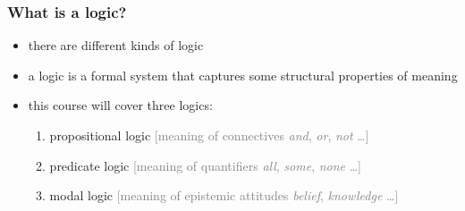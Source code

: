\documentclass[fleqn,10pt,serif,xcolor=svgnames,xcolor=table,aspectratio=169,handout]{beamer}
\newcommand{\mycom}[1]{\hfill {\mygray{[#1]}}}
\newcommand{\mygray}[1]{\textcolor{gray}{#1}}
\begin{document}
\begin{frame}
  \frametitle{What is \textbf{a} logic?}

  \begin{itemize}
    \item there are different kinds of logic
    \item a logic is a formal system that captures some structural properties of meaning
    \item this course will cover three logics:
    \begin{enumerate}
      \item propositional logic \mycom{meaning of connectives \textit{and}, \textit{or}, \textit{not} \dots}
      \item predicate logic \mycom{meaning of quantifiers \textit{all}, \textit{some}, \textit{none} \dots}
      \item modal logic \mycom{meaning of epistemic attitudes \textit{belief}, \textit{knowledge} \dots}
    \end{enumerate}
  \end{itemize}

\end{frame}
\end{document}
